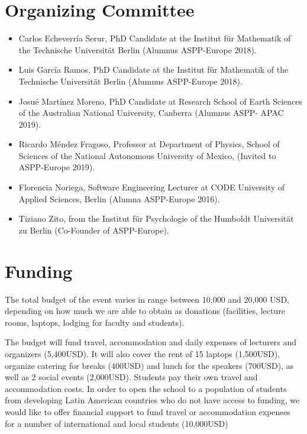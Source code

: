 \documentclass{article}[11pt]
\begin{document}
\section*{Organizing Committee}
\begin{itemize}
\item Carlos Echeverr\'ia Serur, PhD Candidate at the Institut f\"ur
Mathematik of the Technische Universit\"at Berlin (Alumnus ASPP-Europe
2018).

\item Luis Garc\'ia Ramos, PhD Candidate at the Institut f\"ur Mathematik
of the Technische Universit\"at Berlin (Alumnus ASPP-Europe 2018).

\item Josu\'e Mart\'inez Moreno, PhD Candidate at Research School of Earth
Sciences of the Australian National University, Canberra (Alumnus ASPP-
APAC 2019).

\item Ricardo M\'endez Fragoso, Professor at Department of Physics, School
of Sciences of the National Autonomous University of Mexico, (Invited to
ASPP-Europe 2019).

\item Florencia Noriega, Software Engineering Lecturer at CODE University
of Applied Sciences, Berlin (Alumna ASPP-Europe 2016).

\item Tiziano Zito, from the Institut f\"ur Psychologie of the Humboldt
Universit\"at zu Berlin (Co-Founder of ASPP-Europe).
\end{itemize}

\section*{Funding}
The total budget of the event varies in range between 10,000 and 20,000 USD,
depending on how much we are able to obtain as donations (facilities, lecture
rooms, laptops, lodging for faculty and students).

The budget will fund travel, accommodation and daily expenses of lecturers and
organizers (5,400USD). It will also cover the rent of 15 laptops (1,500USD),
organize catering for breaks (400USD) and lunch for the speakers (700USD), as
well as 2 social events (2,000USD). Students pay their own travel and
accommodation costs. In order to open the school to a population of students
from developing Latin American countries who do not have access to funding, we
would like to offer financial support to fund travel or accommodation expenses
for a number of international and local students (10,000USD)
\end{document}
